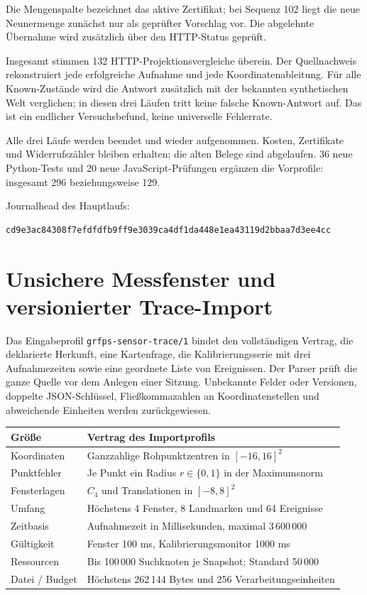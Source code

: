 \documentclass[11pt,a4paper]{article}
\newcommand{\nextsection}[2]{\clearpage{\color{accent}\small\textsf{#1}}\section{#2}}
\begin{document}
Die Mengenspalte bezeichnet das aktive Zertifikat; bei Sequenz 102
liegt die neue Neunermenge zunächst nur als geprüfter Vorschlag vor.
Die abgelehnte Übernahme wird zusätzlich über den HTTP-Status geprüft.

Insgesamt stimmen 132 HTTP-Projektionsvergleiche überein. Der
Quellnachweis rekonstruiert jede erfolgreiche Aufnahme und jede
Koordinatenableitung. Für alle Known-Zustände wird die Antwort
zusätzlich mit der bekannten synthetischen Welt verglichen;
in diesen drei Läufen tritt keine falsche Known-Antwort auf.
Das ist ein endlicher Versuchsbefund, keine universelle Fehlerrate.

Alle drei Läufe werden beendet und wieder aufgenommen. Kosten,
Zertifikate und Widerrufszähler bleiben erhalten; die alten Belege
sind abgelaufen. 36 neue Python-Tests und 20 neue JavaScript-Prüfungen
ergänzen die Vorprofile: insgesamt 296 beziehungsweise 129.

Journalhead des Hauptlaufs:
\begin{lstlisting}
cd9e3ac84308f7efdfdfb9ff9e3039ca4df1da448e1ea43119d2bbaa7d3ee4cc
\end{lstlisting}

\nextsection{66 / AUFNAHMEVERTRAG}{Unsichere Messfenster und versionierter Trace-Import}
Das Eingabeprofil \texttt{grfps-sensor-trace/1} bindet den vollständigen
Vertrag, die deklarierte Herkunft, eine Kartenfrage, die
Kalibrierungsserie mit drei Aufnahmezeiten sowie eine geordnete
Liste von Ereignissen. Der Parser prüft die ganze Quelle vor dem
Anlegen einer Sitzung. Unbekannte Felder oder Versionen, doppelte
JSON-Schlüssel, Fließkommazahlen an Koordinatenstellen und
abweichende Einheiten werden zurückgewiesen.

\begin{tabularx}{\linewidth}{@{}lY@{}}\toprule
Größe & Vertrag des Importprofils\\\midrule
Koordinaten & Ganzzahlige Rohpunktzentren in $[-16,16]^2$\\
Punktfehler & Je Punkt ein Radius $r\in\{0,1\}$ in der Maximumsnorm\\
Fensterlagen & $C_4$ und Translationen in $[-8,8]^2$\\
Umfang & Höchstens 4 Fenster, 8 Landmarken und 64 Ereignisse\\
Zeitbasis & Aufnahmezeit in Millisekunden, maximal 3\,600\,000\\
Gültigkeit & Fenster 100 ms, Kalibrierungsmonitor 1000 ms\\
Ressourcen & Bis 100\,000 Suchknoten je Snapshot; Standard 50\,000\\
Datei / Budget & Höchstens 262\,144 Bytes und 256 Verarbeitungseinheiten\\\bottomrule
\end{tabularx}
\end{document}
